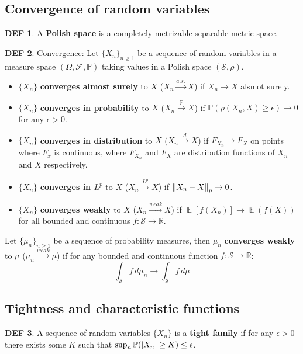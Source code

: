 \documentclass[hidelinks,11pt]{article}
\theoremstyle{definition}
\newtheorem*{defin}{DEF}
\theoremstyle{dotless}
\theoremstyle{remark}
\DeclareMathOperator{\E}{\mathbb{E}}
\DeclareMathOperator{\1}{\mathbf{1}}
\begin{document}
\subsection{Convergence of random variables}

\begin{defin}
A \textbf{Polish space} is a completely metrizable separable metric space.
\end{defin}

\begin{defin}Convergence: Let $\{X_n\}_{n\geq1}$ be a sequence of random variables in a measure space $(\Omega,\mathcal{F},\mathbb{P})$ taking values in a Polish space $(\mathcal{S},\rho)$.\begin{itemize}
    \item $\{X_n\}$ \textbf{converges almost surely} to $X$ ($X_n\xrightarrow{a.s.}X$) if $X_n\to X$ alsmot surely.
    \item $\{X_n\}$ \textbf{converges in probability} to $X$ ($X_n\xrightarrow{\mathbb{P}}X$) if $\mathbb{P}(\rho(X_n,X)\geq\epsilon)\to0$ for any $\epsilon>0$.
    \item $\{X_n\}$ \textbf{converges in distribution} to $X$ ($X_n\xrightarrow{d}X$) if $F_{X_n}\to F_X$ on points where $F_x$ is continuous, where $F_{X_n}$ and $F_X$ are distribution functions of $X_n$ and $X$ respectively.
    \item $\{X_n\}$ \textbf{converges in $L^p$} to $X$ ($X_n\xrightarrow{L^p}X$) if $\norm{X_n-X}_p\to0$.
    \item $\{X_n\}$ \textbf{converges weakly} to $X$ ($X_n\xrightarrow{weak}X$) if $\E[f(X_n)]\to\E(f(X))$ for all bounded and continuous $f:\mathcal{S}\to\mathbb{R}$.
\end{itemize}
Let $\{\mu_n\}_{n\geq1}$ be a sequence of probability measures, then $\mu_n$ \textbf{converges weakly} to $\mu$ ($\mu_n\xrightarrow{weak}\mu$) if for any bounded and continuous function $f:\mathcal{S}\to\mathbb{R}$:
\[\int_\mathcal{S}f\,d\mu_n\to\int_\mathcal{S}f\,d\mu\]
\end{defin}

\subsection{Tightness and characteristic functions}

\begin{defin}
A sequence of random variables $\{X_n\}$ is a \textbf{tight family} if for any $\epsilon>0$ there exists some $K$ such that $\sup_n\mathbb{P}(\abs{X_n}\geq K)\leq\epsilon$.
\end{defin}
\end{document}
